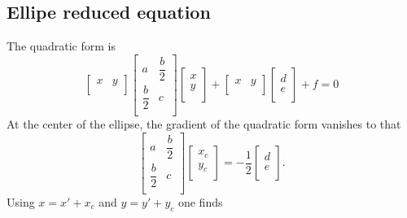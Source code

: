 \documentclass[aps]{revtex4}
\begin{document}
\subsection{Ellipe reduced equation}
The quadratic  form is
\begin{equation}
\begin{bmatrix}
x & y\\
\end{bmatrix}
\begin{bmatrix}
 a & \dfrac{b}{2} \\
 \dfrac{b}{2} & c\\
\end{bmatrix}
	\begin{bmatrix}
	x\\
	y\\
	\end{bmatrix}
	+
	\begin{bmatrix}
	x & y\\
	\end{bmatrix}
	\begin{bmatrix}
	d\\
	e\\
	\end{bmatrix}
	+f = 0
\end{equation}
At the center of the ellipse, the gradient of the quadratic form vanishes to that
\begin{equation}
	\begin{bmatrix}
 a & \dfrac{b}{2} \\
 \dfrac{b}{2} & c\\
\end{bmatrix}
\begin{bmatrix}
	x_c\\
	y_c\\
\end{bmatrix}
= -\dfrac{1}{2} 
\begin{bmatrix}
	d\\
	e\\
	\end{bmatrix}.
\end{equation}
Using $x=x'+x_c$ and $y=y'+y_c$
one finds
\end{document}
